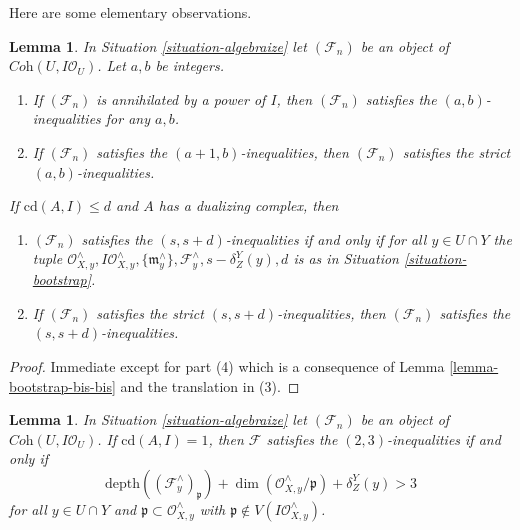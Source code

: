 \documentclass{stacks-project}
\theoremstyle{plain}
\newtheorem{lemma}[subsection]{Lemma}
\theoremstyle{definition}
\theoremstyle{remark}
\numberwithin{equation}{subsection}
\begin{document}
\noindent
Here are some elementary observations.

\begin{lemma}
\label{lemma-elementary}
In Situation \ref{situation-algebraize} let $(\mathcal{F}_n)$ be an object
of $\textit{Coh}(U, I\mathcal{O}_U)$. Let $a, b$ be integers.
\begin{enumerate}
\item If $(\mathcal{F}_n)$ is annihilated by a power of $I$, then
$(\mathcal{F}_n)$ satisfies the $(a, b)$-inequalities for any $a, b$.
\item If $(\mathcal{F}_n)$ satisfies the $(a + 1, b)$-inequalities, then
$(\mathcal{F}_n)$ satisfies the strict $(a, b)$-inequalities.
\end{enumerate}
If $\text{cd}(A, I) \leq d$ and $A$ has a dualizing complex, then
\begin{enumerate}
\item[(3)] $(\mathcal{F}_n)$ satisfies the $(s, s + d)$-inequalities
if and only if for all $y \in U \cap Y$ the tuple
$\mathcal{O}_{X, y}^\wedge, I\mathcal{O}_{X, y}^\wedge,
\{\mathfrak m_y^\wedge\}, \mathcal{F}_y^\wedge, s - \delta^Y_Z(y), d$
is as in Situation \ref{situation-bootstrap}.
\item[(4)]
If $(\mathcal{F}_n)$ satisfies the strict $(s, s + d)$-inequalities, then
$(\mathcal{F}_n)$ satisfies the $(s, s + d)$-inequalities.
\end{enumerate}
\end{lemma}

\begin{proof}
Immediate except for part (4) which is a consequence of
Lemma \ref{lemma-bootstrap-bis-bis} and the translation in (3).
\end{proof}

\begin{lemma}
\label{lemma-explain-2-3-cd-1}
In Situation \ref{situation-algebraize} let $(\mathcal{F}_n)$ be an object
of $\textit{Coh}(U, I\mathcal{O}_U)$. If $\text{cd}(A, I) = 1$, then
$\mathcal{F}$ satisfies the $(2, 3)$-inequalities if and only if
$$
\text{depth}((\mathcal{F}^\wedge_y)_\mathfrak p) +
\dim(\mathcal{O}_{X, y}^\wedge/\mathfrak p) + \delta^Y_Z(y) > 3
$$
for all $y \in U \cap Y$ and $\mathfrak p \subset \mathcal{O}_{X, y}^\wedge$
with $\mathfrak p \not \in V(I\mathcal{O}_{X, y}^\wedge)$.
\end{lemma}
\end{document}
